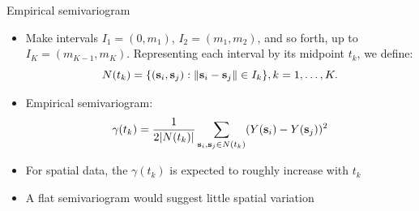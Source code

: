 \begin{frame}{Empirical semivariogram}
	\begin{itemize}
		\item {} Make intervals $I_1=(0,m_1)$,
		$I_2=(m_1,m_2)$, and so forth, up to $I_K=(m_{K-1},m_K)$.
		Representing each interval by its midpoint $t_k$, we
		define:
		\[
		N(t_k) = \{(\textbf{s}_i,\textbf{s}_j): \|\textbf{s}_i - \textbf{s}_j\| \in I_k \},
		k=1,\ldots,K.
		\]
		\item \alert{Empirical semivariogram:}
		\[
		\gamma(t_k) = \frac{1}{2|N(t_k)|}\sum_{\textbf{s}_i,\textbf{s}_j \in
			N(t_k)}(Y(\textbf{s}_i)-Y(\textbf{s}_j))^2
		\]
		\item For spatial data, the $\gamma(t_k)$ is expected to roughly increase with $t_k$
		\item A flat semivariogram would suggest little spatial variation
	\end{itemize}
\end{frame}

